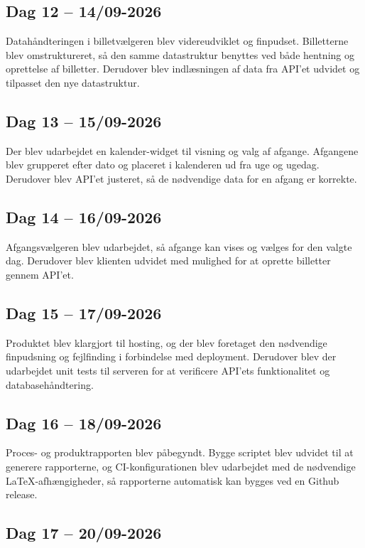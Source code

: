 \documentclass[a4paper, 11pt]{article}
\begin{document}
\subsection{Dag 12 -- 14/09-2026}

Datahåndteringen i billetvælgeren blev videreudviklet og finpudset. Billetterne blev
omstruktureret, så den samme datastruktur benyttes ved både hentning og oprettelse af billetter.
Derudover blev indlæsningen af data fra API'et udvidet og tilpasset den nye datastruktur.

\subsection{Dag 13 -- 15/09-2026}

Der blev udarbejdet en kalender-widget til visning og valg af afgange. Afgangene blev grupperet
efter dato og placeret i kalenderen ud fra uge og ugedag. Derudover blev API'et justeret, så de
nødvendige data for en afgang er korrekte.

\subsection{Dag 14 -- 16/09-2026}

Afgangsvælgeren blev udarbejdet, så afgange kan vises og vælges for den valgte dag. Derudover
blev klienten udvidet med mulighed for at oprette billetter gennem API'et.

\subsection{Dag 15 -- 17/09-2026}

Produktet blev klargjort til hosting, og der blev foretaget den nødvendige finpudsning og
fejlfinding i forbindelse med deployment. Derudover blev der udarbejdet unit tests til serveren
for at verificere API'ets funktionalitet og databasehåndtering.

\subsection{Dag 16 -- 18/09-2026}

Proces- og produktrapporten blev påbegyndt. Bygge scriptet blev udvidet til at generere rapporterne,
og CI-konfigurationen blev udarbejdet med de nødvendige LaTeX-afhængigheder, så rapporterne
automatisk kan bygges ved en Github release.

\subsection{Dag 17 – 20/09-2026}
\end{document}
